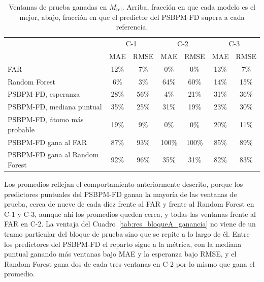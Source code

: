 \begin{table}[H]
\centering\small
\caption{Ventanas de prueba ganadas en $M_{\mathrm{ref}}$. Arriba, fracción en que cada modelo es el mejor, abajo, fracción en que el predictor del PSBPM-FD supera a cada referencia.}
\label{tab:res_bloqueA_ventanas}
\begin{tabular}{l cc cc cc}
\hline
 & \multicolumn{2}{c}{C-1} & \multicolumn{2}{c}{C-2} & \multicolumn{2}{c}{C-3} \\
 & MAE & RMSE & MAE & RMSE & MAE & RMSE \\
\hline
FAR & 12\% & 7\% & 0\% & 0\% & 13\% & 7\% \\
Random Forest & 6\% & 3\% & 64\% & 60\% & 14\% & 15\% \\
PSBPM-FD, esperanza & 28\% & 56\% & 4\% & 21\% & 31\% & 36\% \\
PSBPM-FD, mediana puntual & 35\% & 25\% & 31\% & 19\% & 23\% & 30\% \\
PSBPM-FD, átomo más probable & 19\% & 9\% & 0\% & 0\% & 20\% & 11\% \\
\hline
PSBPM-FD gana al FAR & 87\% & 93\% & 100\% & 100\% & 85\% & 89\% \\
PSBPM-FD gana al Random Forest & 92\% & 96\% & 35\% & 31\% & 82\% & 83\% \\
\hline
\end{tabular}
\end{table}



Los promedios reflejan el comportamiento anteriormente descrito, porque los predictores puntuales del PSBPM-FD ganan la mayoría de las ventanas de prueba, cerca de nueve de cada diez frente al FAR y frente al Random Forest en C-1 y C-3, aunque ahí los promedios queden cerca, y todas las ventanas frente al FAR en C-2. La ventaja del Cuadro~\ref{tab:res_bloqueA_ganancia} no viene de un tramo particular del bloque de prueba sino que se repite a lo largo de él. Entre los predictores del PSBPM-FD el reparto sigue a la métrica, con la mediana puntual ganando más ventanas bajo MAE y la esperanza bajo RMSE, y el Random Forest gana dos de cada tres ventanas en C-2 por lo mismo que gana el promedio.


